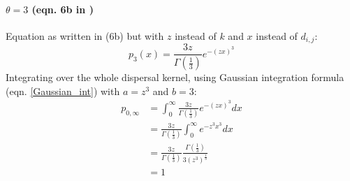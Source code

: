 \documentclass[12pt, oneside]{article}   	%
\begin{document}
\paragraph*{$\theta = 3$ (eqn. 6b in \cite{bode2018estimating})}
Equation as written in \cite{bode2018estimating} (6b) but with $z$ instead of $k$ and $x$ instead of $d_{i,j}$:
\begin{equation}
p_3(x) = \frac{3z}{\Gamma(\frac{1}{3})} e^{-(zx)^3}
\end{equation}
Integrating over the whole dispersal kernel, using Gaussian integration formula (eqn. \ref{Gaussian_int}) with $a = z^3$ and $b = 3$:
\begin{equation}
	\begin{split}
	p_{0, \infty} & = \int_0^{\infty} \frac{3z}{\Gamma(\frac{1}{3})} e^{-(zx)^3} dx \\
				  & = \frac{3z}{\Gamma(\frac{1}{3})} \int_0^{\infty} e^{-z^3x^3} dx \\
				  & = \frac{3z}{\Gamma(\frac{1}{3})} \frac{\Gamma(\frac{1}{3})}{3(z^3)^{\frac{1}{3}}} \\
				  & = 1
	\end{split}
\end{equation}





\end{document}

